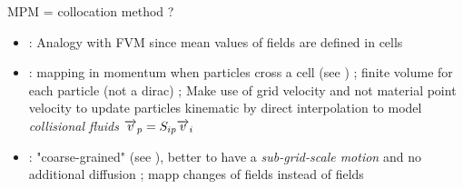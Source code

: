 MPM = collocation method ?
\begin{itemize}
\item \cite{PIC}: Analogy with FVM since mean values of fields are defined in cells
\item \cite{FLIP}: mapping in momentum when particles cross a cell (see \cite{PIC_Nishiguchi}) ; finite volume for each particle (not a dirac) ; Make use of grid velocity and not material point velocity to update particles kinematic by direct interpolation to model \textit{collisional fluids} ${\overrightarrow{v}}_p=S_{ip}{\overrightarrow{v}}_i$
\item \cite{Mass_Flip}: "coarse-grained" (see \cite{Brackbill_PIC}), better to have a \textit{sub-grid-scale motion} and no additional diffusion ; mapp changes of fields instead of fields 
\end{itemize}


